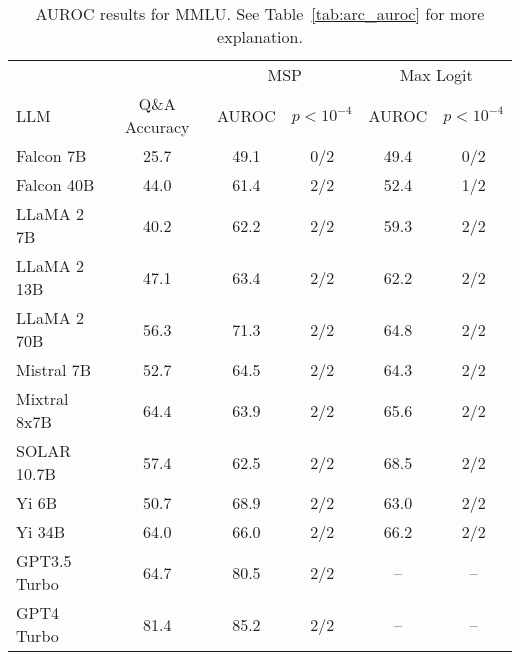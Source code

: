 \begin{table*}
\centering
\caption{AUROC results for MMLU. See Table~\ref{tab:arc_auroc} for more explanation.}
\label{tab:mmlu_auroc}
\begin{tabular}{lccccc}
\toprule
& & \multicolumn{2}{c}{MSP} & \multicolumn{2}{c}{Max Logit} \\ 
LLM & Q\&A Accuracy & AUROC & $p < 10^{-4}$ & AUROC & $p < 10^{-4}$\\ 
\cmidrule(lr){1-1} \cmidrule(lr){2-2} \cmidrule(lr){3-4} \cmidrule(lr){5-6}
Falcon 7B & 25.7 & 49.1 & 0/2 & 49.4 & 0/2 \\
Falcon 40B & 44.0 & 61.4 & 2/2 & 52.4 & 1/2 \\
LLaMA 2 7B & 40.2 & 62.2 & 2/2 & 59.3 & 2/2\\
LLaMA 2 13B & 47.1 & 63.4 & 2/2 & 62.2 & 2/2\\
LLaMA 2 70B & 56.3 & 71.3 & 2/2 & 64.8 & 2/2\\
Mistral 7B & 52.7 & 64.5 & 2/2 & 64.3 & 2/2 \\
Mixtral 8x7B & 64.4 & 63.9 & 2/2 & 65.6 & 2/2\\
SOLAR 10.7B & 57.4 & 62.5 & 2/2 & 68.5 & 2/2 \\
Yi 6B & 50.7 & 68.9 & 2/2 & 63.0 & 2/2\\
Yi 34B & 64.0 & 66.0 & 2/2 & 66.2 & 2/2\\
GPT3.5 Turbo & 64.7 & 80.5 & 2/2 & -- & -- \\
GPT4 Turbo & 81.4 & 85.2 & 2/2 & -- & -- \\
\bottomrule
\end{tabular}
\end{table*}

